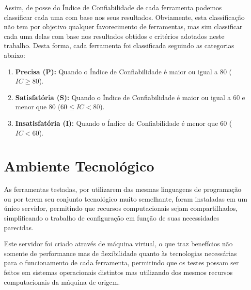 Assim, de posse do Índice de Confiabilidade de cada ferramenta podemos classificar cada uma com base nos seus resultados. Obviamente, esta classificação não tem por objetivo qualquer favorecimento de ferramentas, mas sim classificar cada uma delas com base nos resultados obtidos e critérios adotados neste trabalho. Desta forma, cada ferramenta foi classificada seguindo as categorias abaixo:

\begin{enumerate}
    \item \textbf{Precisa (P):} Quando o Índice de Confiabilidade é maior ou igual a 80 ($IC\geq80$).
    \item \textbf{Satisfatória (S):} Quando o Índice de Confiabilidade é maior ou igual a 60 e menor que 80 ($60 \leq IC < 80$).
    \item \textbf{Insatisfatória (I):} Quando o Índice de Confiabilidade é menor que 60 ($IC < 60$).
\end{enumerate}

\section{Ambiente Tecnológico}
\label{sec:tech-environment}

As ferramentas testadas, por utilizarem das mesmas linguagens de programação ou por terem seu conjunto tecnológico muito semelhante, foram instaladas em um único servidor, permitindo que recursos computacionais sejam compartilhados, simplificando o trabalho de configuração em função de suas necessidades parecidas.

Este servidor foi criado através de máquina virtual, o que traz benefícios não somente de performance mas de flexibilidade quanto às tecnologias necessárias para o funcionamento de cada ferramenta, permitindo que os testes possam ser feitos em sistemas operacionais distintos mas utilizando dos mesmos recursos computacionais da máquina de origem.


